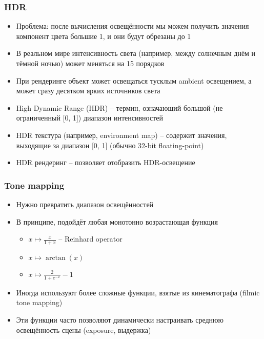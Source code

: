 \documentclass{beamer}
\begin{document}
\begin{frame}[fragile]
\frametitle{HDR}
\begin{itemize}
\item Проблема: после вычисления освещённости мы можем получить значения компонент цвета большие 1, и они будут обрезаны до 1
\pause
\item В реальном мире интенсивность света (например, между солнечным днём и тёмной ночью) может меняться на 15 порядков
\pause
\item При рендеринге объект может освещаться тусклым ambient освещением, а может сразу десятком ярких источников света
\pause
\item High Dynamic Range (HDR) -- термин, означающий большой (не ограниченный [0, 1]) диапазон интенсивностей
\pause
\item HDR текстура (например, environment map) -- содержит значения, выходящие за диапазон [0, 1] (обычно 32-bit floating-point)
\pause
\item HDR рендеринг -- позволяет отобразить HDR-освещение
\end{itemize}
\end{frame}

\begin{frame}[fragile]
\frametitle{Tone mapping}
\begin{itemize}
\item Нужно превратить диапазон освещённостей \begin{math}[0, \infty)\end{math} в диапазон \begin{math}[0, 1]\end{math}
\pause
\item В принципе, подойдёт любая монотонно возрастающая функция \begin{math}[0, \infty)\rightarrow [0, 1]\end{math}
\begin{itemize}
\item \begin{math}x \mapsto \frac{x}{1+x}\end{math} -- Reinhard operator
\item \begin{math}x \mapsto \arctan(x)\end{math}
\item \begin{math}x \mapsto \frac{2}{1+e^{-x}}-1\end{math}
\end{itemize}
\pause
\item Иногда используют более сложные функции, взятые из кинематографа (filmic tone mapping)
\pause
\item Эти функции часто позволяют динамически настраивать среднюю освещённость сцены (exposure, выдержка)
\end{itemize}
\end{frame}
\end{document}
